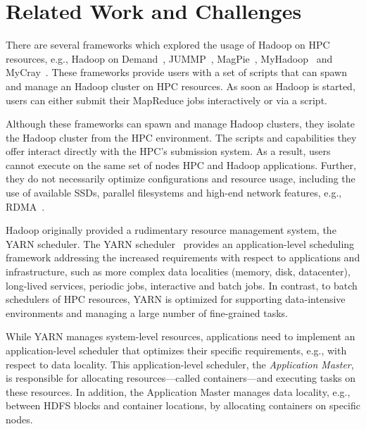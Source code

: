\section{Related Work and Challenges}
\label{sec:hpc_hadoop_rel}

There are several frameworks which explored the usage of Hadoop on HPC resources, e.g., Hadoop on Demand~\cite{hod}, JUMMP~\cite{moody2013jummp}, MagPie~\cite{chu2015magpie}, MyHadoop~\cite{krishnan2011myhadoop} and MyCray~\cite{mycray}.
These frameworks provide users with a set of scripts that can spawn and manage an Hadoop cluster on HPC resources.
As soon as Hadoop is started, users can either submit their MapReduce jobs interactively or via a script.

Although these frameworks can spawn and manage Hadoop clusters, they isolate the Hadoop cluster from the HPC environment.
The scripts and capabilities they offer interact directly with the HPC's submission system.
As a result, users cannot execute on the same set of nodes HPC and Hadoop applications.
Further, they do not necessarily optimize configurations and resource usage, including the use of available SSDs, parallel filesystems and high-end network features, e.g., RDMA~\cite{rahman2014homr}.

Hadoop originally provided a rudimentary resource management system, the YARN scheduler.
The YARN scheduler~\cite{vavilapalli2013apache} provides an application-level scheduling framework addressing the increased requirements with respect to applications and infrastructure, such as more complex data localities (memory, disk, datacenter), long-lived services, periodic jobs, interactive and batch jobs.
In contrast, to batch schedulers of HPC resources, YARN is optimized for supporting data-intensive environments and managing a large number of fine-grained tasks.

While YARN manages system-level resources, applications need to implement an application-level scheduler that optimizes their specific requirements, e.g., with respect to data locality.
This application-level scheduler, the \textit{Application Master}, is responsible for allocating resources---called containers---and executing tasks on these resources.
In addition, the Application Master manages data locality, e.g., between HDFS blocks and container locations, by allocating containers on specific nodes.

